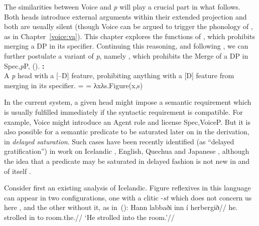 The similarities between Voice and \emph{p} will play a crucial part in what follows. Both heads introduce external arguments within their extended projection and both are usually silent (though Voice can be argued to trigger the phonology of {\tkal}, as in Chapter~\ref{voice:va}). This chapter explores the functions of {\vz}, which prohibits merging a DP in its specifier. Continuing this reasoning, and following \cite{wood15springer}, we can further postulate a variant of \emph{p}, namely {\pz}, which prohibits the Merge of a DP in Spec,\emph{p}P, (\nextx).
\pex
	\a \textbf{\pz:}\\
    A \emph{p} head with a [--D] feature, prohibiting anything with a [D] feature from merging in its specifier.
    \a \denote{\pz} =  = λxλs.Figure(x,s)
\xe


In the current system, a given head might impose a semantic requirement which is usually fulfilled immediately if the syntactic requirement is compatible. For example, Voice might introduce an Agent role and license Spec,VoiceP. But it is also possible for a semantic predicate to be saturated later on in the derivation, in \emph{delayed saturation}. Such cases have been recently identified (as “delayed gratification”) in work on Icelandic \citep{wood14nllt,wood15springer}, English, Quechua \citep{myler16mit} and Japanese \citep{woodmarantz17}, although the idea that a predicate may be saturated in delayed fashion is not new in and of itself \citep{higginbotham85}.

Consider first an existing analysis of Icelandic. Figure reflexives in this language can appear in two configurations, one with a clitic -\emph{st} which does not concern us here \citep{wood14nllt}, and the other without it, as in~(\nextx):
\ex\label{ex:vz:is-figrefl}
	 \begingl
	 \gla Hann labbaði inn í herbergið//
	 \glb he. strolled in to room.the.//
	 \glft `He strolled into the room.'//
	 \endgl
\xe

